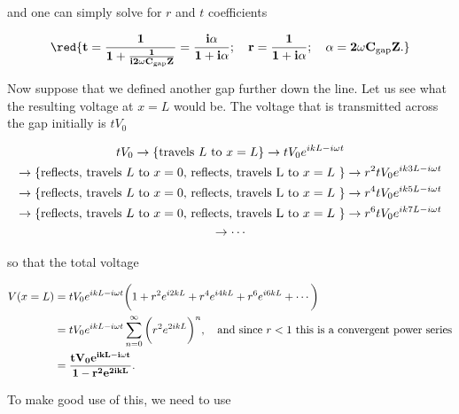  \noindent and one can simply solve for $ r $ and $ t $ coefficients
 
 \begin{equation}\label{tLinert}
 	 \mathbf{\red{t= \frac{1}{1+\frac{1}{i2\omega C_\text{gap}Z}} = \frac{i\alpha}{1+i\alpha};\quad	 r = \frac{1}{1+i\alpha};\quad \alpha = 2\omega C_\text{gap}Z.}}
 \end{equation}
 
 \begin{figure}
 \end{figure}
 
 Now suppose that we defined another gap further down the line. Let us see what the resulting voltage at $ x=L $ would be. The voltage that is transmitted across the gap initially is $ tV_0 $

 \begin{multline}\label{tlineMUltiple}
 	tV_0 \rightarrow \left\lbrace \text{travels $ L $ to $ x=L $}\right\rbrace \rightarrow tV_0e^{ikL-i\omega t} \\ \rightarrow\left\lbrace \text{reflects, travels $ L $ to $ x=0 $, reflects, travels L to $ x=L $ }\right\rbrace\rightarrow r^2tV_0e^{ik3L-i\omega t}\\ \rightarrow\left\lbrace \text{reflects, travels $ L $ to $ x=0 $, reflects, travels L to $ x=L $ }\right\rbrace\rightarrow r^4tV_0e^{ik5L-i\omega t}
 	\\ \rightarrow\left\lbrace \text{reflects, travels $ L $ to $ x=0 $, reflects, travels L to $ x=L $ }\right\rbrace\rightarrow r^6tV_0e^{ik7L-i\omega t}
 	\\ \rightarrow\cdots
 \end{multline}
 
 \noindent so that the total voltage
 
 \begin{equation}\label{tlineTotalVoltage}
 	\begin{aligned}
 	V(x=L) & = tV_0e^{ikL-i\omega t}\bigg(1+r^2e^{i2kL}+r^4e^{i4kL}+r^6e^{i6kL}+\cdots\bigg)\\
 	& = tV_0e^{ikL-i\omega t}\sum_{n=0}^{\infty}\bigg(r^2e^{2ikL}\bigg)^n, \quad\text{and since $ r<1 $ this is a convergent power series}\\
 	& = \mathbf{\frac{tV_0e^{ikL-i\omega t}}{1-r^2e^{2ikL}}.}
 	\end{aligned}
 \end{equation}
 
 \noindent To make good use of this, we need to use
 

